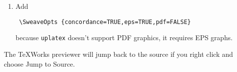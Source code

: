 \documentclass[12pt]{ujarticle}
\begin{document}
\begin{enumerate}
\item Add 
\begin{verbatim}
 \SweaveOpts {concordance=TRUE,eps=TRUE,pdf=FALSE}
\end{verbatim}
because \verb!uplatex! doesn't support PDF graphics, it requires EPS graphs.
\end{enumerate}

The TeXWorks previewer will jump back to the source if you right click and choose Jump to Source.


\end{document}

